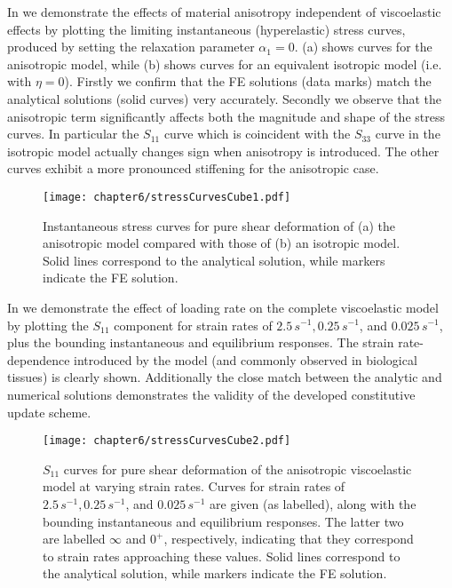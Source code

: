 In  we demonstrate the effects of material anisotropy independent of viscoelastic effects by plotting the limiting instantaneous (hyperelastic) stress curves, produced by setting the relaxation parameter $\alpha_1 = 0$. (a) shows curves for the anisotropic model, while (b) shows curves for an equivalent isotropic model (i.e. with $\eta = 0$). Firstly we confirm that the FE solutions (data marks) match the analytical solutions (solid curves) very accurately. Secondly we observe that the anisotropic term significantly affects both the magnitude and shape of the stress curves. In particular the $S_{11}$ curve which is coincident with the $S_{33}$ curve in the isotropic model actually changes sign when anisotropy is introduced. The other curves exhibit a more pronounced stiffening for the anisotropic case. 
%
\begin{figure}[h]
\begin{center}
\texttt{[image: chapter6/stressCurvesCube1.pdf]}
\end{center}
\caption[Stress comparison with analytical solution for a pure shear of a cube]{Instantaneous stress curves for pure shear deformation of (a) the anisotropic model compared with those of (b) an isotropic model. Solid lines correspond to the analytical solution, while markers indicate the FE solution.}
\label{chap6:fig-stressCurvesCube1}
\end{figure}

In  we demonstrate the effect of loading rate on the complete viscoelastic model by plotting the $S_{11}$ component for strain rates of $2.5\,s^{-1}, 0.25\,s^{-1}$, and $0.025\,s^{-1}$, plus the bounding instantaneous and equilibrium responses. The strain rate-dependence introduced by the model (and commonly observed in biological tissues) is clearly shown. Additionally the close match between the analytic and numerical solutions demonstrates the validity of the developed constitutive update scheme.
%
\begin{figure}[h]
\begin{center}
\texttt{[image: chapter6/stressCurvesCube2.pdf]}
\end{center}
\caption[Stress comparison with analytical solution for a pure shear of a cube at various strain rate]{$S_{11}$ curves for pure shear deformation of the anisotropic viscoelastic model at varying strain rates. Curves for strain rates of $2.5\,s^{-1}, 0.25\,s^{-1}$, and $0.025\,s^{-1}$ are given (as labelled), along with the bounding instantaneous and equilibrium responses. The latter two are labelled $ \infty $ and $0^+$, respectively, indicating that they correspond to strain rates approaching these values. Solid lines correspond to the analytical solution, while markers indicate the FE solution.}
\label{chap6:fig-stressCurvesCube2}
\end{figure}


